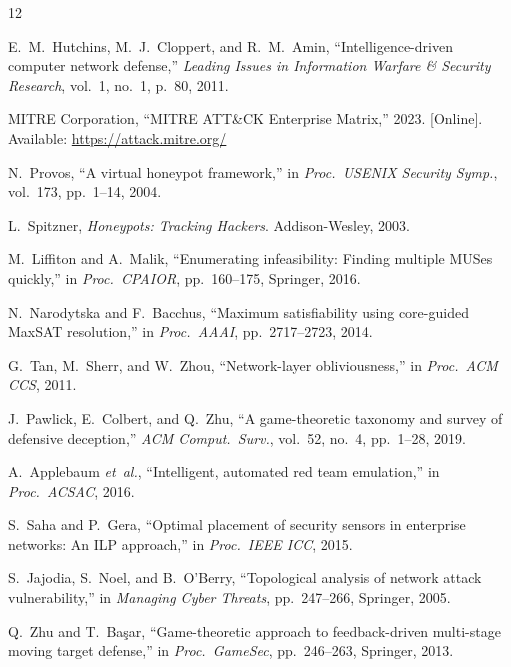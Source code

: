 \documentclass[journal]{IEEEtran}
\newcommand{\etal}{\emph{et~al.}}
\begin{document}
\begin{thebibliography}{12}

E.~M.~Hutchins, M.~J.~Cloppert, and R.~M.~Amin,
``Intelligence-driven computer network defense,''
\textit{Leading Issues in Information Warfare \& Security
Research}, vol.~1, no.~1, p.~80, 2011.

MITRE Corporation,
``MITRE ATT\&CK Enterprise Matrix,'' 2023.
[Online]. Available: \url{https://attack.mitre.org/}

N.~Provos,
``A virtual honeypot framework,''
in \textit{Proc.\ USENIX Security Symp.},
vol.~173, pp.~1--14, 2004.

L.~Spitzner,
\textit{Honeypots: Tracking Hackers}.
Addison-Wesley, 2003.

M.~Liffiton and A.~Malik,
``Enumerating infeasibility: Finding multiple MUSes quickly,''
in \textit{Proc.\ CPAIOR}, pp.~160--175, Springer, 2016.

N.~Narodytska and F.~Bacchus,
``Maximum satisfiability using core-guided MaxSAT resolution,''
in \textit{Proc.\ AAAI}, pp.~2717--2723, 2014.

G.~Tan, M.~Sherr, and W.~Zhou,
``Network-layer obliviousness,''
in \textit{Proc.\ ACM CCS}, 2011.

J.~Pawlick, E.~Colbert, and Q.~Zhu,
``A game-theoretic taxonomy and survey of defensive
deception,''
\textit{ACM Comput.\ Surv.}, vol.~52, no.~4,
pp.~1--28, 2019.

A.~Applebaum \etal,
``Intelligent, automated red team emulation,''
in \textit{Proc.\ ACSAC}, 2016.

S.~Saha and P.~Gera,
``Optimal placement of security sensors in enterprise
networks: An ILP approach,''
in \textit{Proc.\ IEEE ICC}, 2015.

S.~Jajodia, S.~Noel, and B.~O'Berry,
``Topological analysis of network attack vulnerability,''
in \textit{Managing Cyber Threats}, pp.~247--266,
Springer, 2005.

Q.~Zhu and T.~Ba\c{s}ar,
``Game-theoretic approach to feedback-driven multi-stage
moving target defense,''
in \textit{Proc.\ GameSec}, pp.~246--263, Springer, 2013.

\end{thebibliography}
\end{document}
